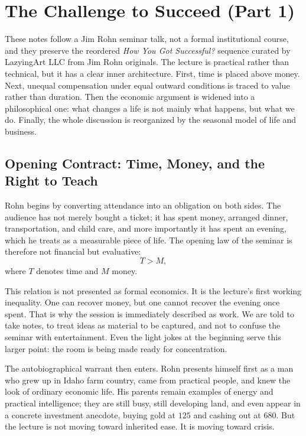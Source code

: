 \chapter{The Challenge to Succeed (Part 1)}

These notes follow a Jim Rohn seminar talk, not a formal institutional course, and they preserve the reordered \emph{How You Got Successful?} sequence curated by LazyingArt LLC from Jim Rohn originals. The lecture is practical rather than technical, but it has a clear inner architecture. First, time is placed above money. Next, unequal compensation under equal outward conditions is traced to value rather than duration. Then the economic argument is widened into a philosophical one: what changes a life is not mainly what happens, but what we do. Finally, the whole discussion is reorganized by the seasonal model of life and business.

\section{Opening Contract: Time, Money, and the Right to Teach}

Rohn begins by converting attendance into an obligation on both sides. The audience has not merely bought a ticket; it has spent money, arranged dinner, transportation, and child care, and more importantly it has spent an evening, which he treats as a measurable piece of life. The opening law of the seminar is therefore not financial but evaluative:
\begin{equation}
T > M,
\end{equation}
where \(T\) denotes time and \(M\) money.

This relation is not presented as formal economics. It is the lecture's first working inequality. One can recover money, but one cannot recover the evening once spent. That is why the session is immediately described as work. We are told to take notes, to treat ideas as material to be captured, and not to confuse the seminar with entertainment. Even the light jokes at the beginning serve this larger point: the room is being made ready for concentration.

The autobiographical warrant then enters. Rohn presents himself first as a man who grew up in Idaho farm country, came from practical people, and knew the look of ordinary economic life. His parents remain examples of energy and practical intelligence; they are still busy, still developing land, and even appear in a concrete investment anecdote, buying gold at \(125\) and cashing out at \(680\). But the lecture is not moving toward inherited ease. It is moving toward crisis.


